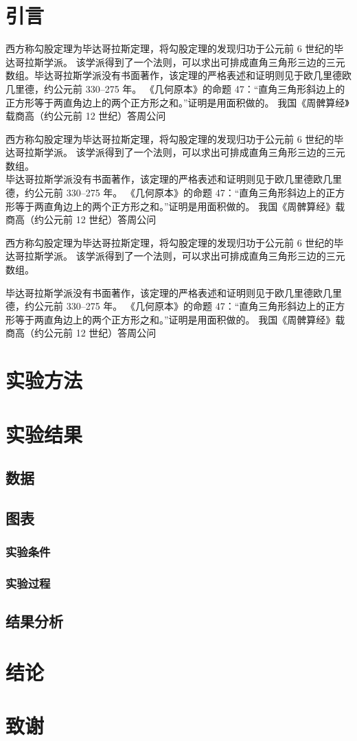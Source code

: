\documentclass{ctexart}
\begin{document}
    \section{引言} %
    西方称勾股定理为毕达哥拉斯定理，将勾股定理的发现归功于公元前 6 世纪的毕达哥拉斯学派。
    该学派得到了一个法则，可以求出可排成直角三角形三边的三元数组。毕达哥拉斯学派没有书面著作，该定理的严格表述和证明则见于欧几里德欧几里德，约公元前 330--275 年。
    《几何原本》的命题 47：“直角三角形斜边上的正方形等于两直角边上的两个正方形之和。”证明是用面积做的。
    我国《周髀算经》载商高（约公元前 12 世纪）答周公问

    西方称勾股定理为毕达哥拉斯定理，将勾股定理的发现归功于公元前 6 世纪的毕达哥拉斯学派。
    该学派得到了一个法则，可以求出可排成直角三角形三边的三元数组。\\毕达哥拉斯学派没有书面著作，该定理的严格表述和证明则见于欧几里德欧几里德，约公元前 330--275 年。
    《几何原本》的命题 47：“直角三角形斜边上的正方形等于两直角边上的两个正方形之和。”证明是用面积做的。
    我国《周髀算经》载商高（约公元前 12 世纪）答周公问

    西方称勾股定理为毕达哥拉斯定理，将勾股定理的发现归功于公元前 6 世纪的毕达哥拉斯学派。
    该学派得到了一个法则，可以求出可排成直角三角形三边的三元数组。\par 毕达哥拉斯学派没有书面著作，该定理的严格表述和证明则见于欧几里德欧几里德，约公元前 330--275 年。
    《几何原本》的命题 47：“直角三角形斜边上的正方形等于两直角边上的两个正方形之和。”证明是用面积做的。
    我国《周髀算经》载商高（约公元前 12 世纪）答周公问
    \section{实验方法}
    \section{实验结果}
    \subsection{数据} %
    \subsection{图表}
    \subsubsection{实验条件} %
    \subsubsection{实验过程}
    \subsection{结果分析}
    \section{结论}
    \section{致谢}
\end{document}
